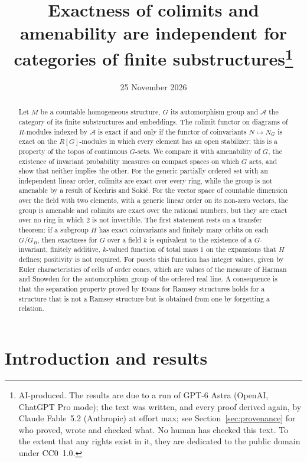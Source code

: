 \documentclass[11pt,a4paper]{article}
\title{Exactness of colimits and amenability are independent for categories
of finite substructures\thanks{AI-produced. The results are due to a run of
GPT-6 Astra (OpenAI, ChatGPT Pro mode); the text was written, and every proof
derived again, by Claude Fable~5.2 (Anthropic) at effort max; see
Section~\ref{sec:provenance} for who proved, wrote and checked what. No human
has checked this text. To the extent that any rights exist in it, they are
dedicated to the public domain under CC0~1.0.}}
\author{}
\date{25 November 2026}
\theoremstyle{definition}
\newcommand{\A}{\mathcal{A}}
\begin{document}
\maketitle

\begin{abstract}
Let $M$ be a countable homogeneous structure, $G$ its automorphism group and
$\A$ the category of its finite substructures and embeddings. The colimit
functor on diagrams of $R$-modules indexed by $\A$ is exact if and only if
the functor of coinvariants $N\mapsto N_G$ is exact on the $R[G]$-modules in
which every element has an open stabilizer; this is a property of the topos
of continuous $G$-sets. We compare it with amenability of $G$, the existence
of invariant probability measures on compact spaces on which $G$ acts, and
show that neither implies the other. For the generic partially ordered set
with an independent linear order, colimits are exact over every ring, while
the group is not amenable by a result of Kechris and Soki\'c. For the vector
space of countable dimension over the field with two elements, with a generic
linear order on its non-zero vectors, the group is amenable and colimits are
exact over the rational numbers, but they are exact over no ring in which
$2$ is not invertible. The first statement rests on a transfer theorem: if a
subgroup $H$ has exact coinvariants and finitely many orbits on each
$G/G_B$, then exactness for $G$ over a field $k$ is equivalent to the
existence of a $G$-invariant, finitely additive, $k$-valued function of total
mass $1$ on the expansions that $H$ defines; positivity is not required. For
posets this function has integer values, given by Euler characteristics of
cells of order cones, which are values of the measure of Harman and Snowden
for the automorphism group of the ordered real line. A consequence is that
the separation property proved by Evans for Ramsey structures holds for a
structure that is not a Ramsey structure but is obtained from one by
forgetting a relation.
\end{abstract}

\section{Introduction and results}\label{sec:intro}
\end{document}
